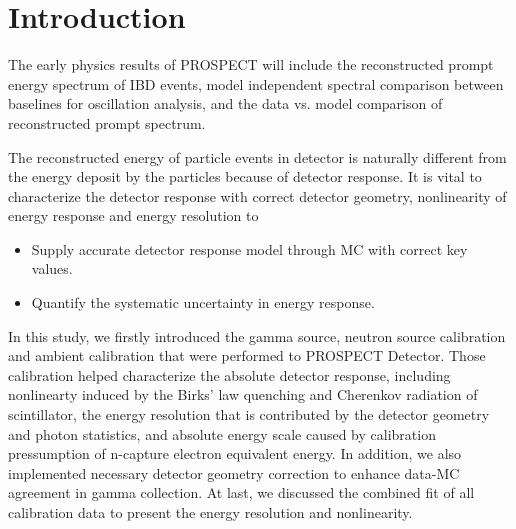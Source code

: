 




\newpage
\tableofcontents{}









\newpage

\section{Introduction}
\label{sec:intro}
The early physics results of PROSPECT will include the reconstructed prompt energy spectrum of IBD events, model independent spectral comparison between baselines for oscillation analysis, and the data vs. model comparison of reconstructed prompt spectrum.

The reconstructed energy of particle events in detector is naturally different from the energy deposit by the particles because of detector response. 
It is vital to characterize the detector response with correct detector geometry, nonlinearity of energy response and energy resolution to
\begin{itemize}
    \item Supply accurate detector response model through MC with correct key values.
    \item Quantify the systematic uncertainty in energy response. 
\end{itemize}

In this study, we firstly introduced the gamma source, neutron source calibration and ambient calibration that were performed to PROSPECT Detector. 
Those calibration helped characterize the absolute detector response, including nonlinearty induced by the Birks' law quenching and Cherenkov radiation of scintillator, the energy resolution that is contributed by the detector geometry and photon statistics, and absolute energy scale caused by calibration pressumption of n-capture electron equivalent energy. 
In addition, we also implemented necessary detector geometry correction to enhance data-MC agreement in gamma collection.
At last, we discussed the combined fit of all calibration data to present the energy resolution and nonlinearity.


